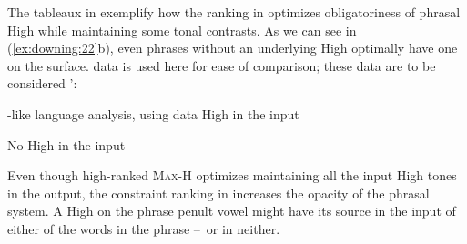 \documentclass[output=paper,newtxmath,modfonts,nonflat,draft]{langsci/langscibook}
\begin{document}
The tableaux in  exemplify how the ranking in  optimizes obligatoriness of phrasal High  while maintaining some tonal contrasts. As we can see in (\ref{ex:downing:22}b), even phrases without an underlying High  optimally have one on the surface.  data is used here for ease of comparison; these data are to be considered ’:


\ea\label{ex:downing:22}-like language analysis, using  data
\ea\label{ex:downing:22a} High  in the input

\sn
\ex\label{ex:downing:22b}No High  in the input 

\z
\z
Even though high-ranked \textsc{Max-H} optimizes maintaining all the input High tones in the output, the constraint ranking in  increases the opacity of the phrasal  system. A High  on the phrase penult vowel might have its source in the input of either of the words in the phrase –~or in neither.
\end{document}
